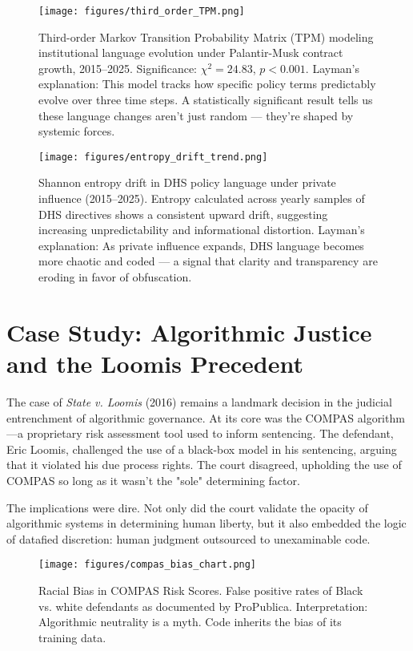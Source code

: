 \begin{figure}[h!]
  \centering
  \texttt{[image: figures/third\_order\_TPM.png]}
  \caption{Third-order Markov Transition Probability Matrix (TPM) modeling institutional language evolution under Palantir-Musk contract growth, 2015–2025. Significance: \(\chi^2 = 24.83\), \(p < 0.001\). Layman's explanation: This model tracks how specific policy terms predictably evolve over three time steps. A statistically significant result tells us these language changes aren't just random — they're shaped by systemic forces.}
\end{figure}

\begin{figure}[h!]
  \centering
  \texttt{[image: figures/entropy\_drift\_trend.png]}
  \caption{Shannon entropy drift in DHS policy language under private influence (2015–2025). Entropy calculated across yearly samples of DHS directives shows a consistent upward drift, suggesting increasing unpredictability and informational distortion. Layman's explanation: As private influence expands, DHS language becomes more chaotic and coded — a signal that clarity and transparency are eroding in favor of obfuscation.}
\end{figure}

\section{Case Study: Algorithmic Justice and the Loomis Precedent}
The case of \textit{State v. Loomis} (2016) remains a landmark decision in the judicial entrenchment of algorithmic governance. At its core was the COMPAS algorithm—a proprietary risk assessment tool used to inform sentencing. The defendant, Eric Loomis, challenged the use of a black-box model in his sentencing, arguing that it violated his due process rights. The court disagreed, upholding the use of COMPAS so long as it wasn't the "sole" determining factor.

The implications were dire. Not only did the court validate the opacity of algorithmic systems in determining human liberty, but it also embedded the logic of datafied discretion: human judgment outsourced to unexaminable code.

\begin{figure}[h!]
  \centering
  \texttt{[image: figures/compas\_bias\_chart.png]}
  \caption{Racial Bias in COMPAS Risk Scores. False positive rates of Black vs. white defendants as documented by ProPublica. Interpretation: Algorithmic neutrality is a myth. Code inherits the bias of its training data.}
\end{figure}

